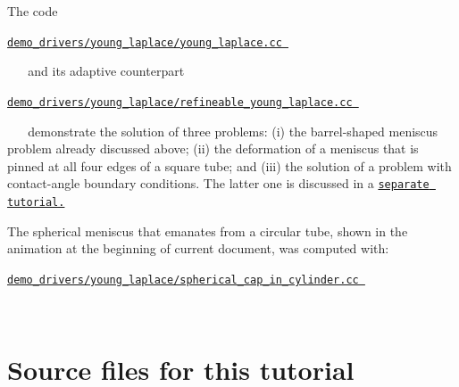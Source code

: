 \begin{DoxyEnumerate}
\begin{DoxyItemize}
\item The code ~\newline
~\newline
 \begin{center} \href{../../../../demo_drivers/young_laplace/young_laplace.cc}{\tt demo\+\_\+drivers/young\+\_\+laplace/young\+\_\+laplace.\+cc } \end{center}  ~\newline
~\newline
 and its adaptive counterpart ~\newline
~\newline
 \begin{center} \href{../../../../demo_drivers/young_laplace/refineable_young_laplace.cc}{\tt demo\+\_\+drivers/young\+\_\+laplace/refineable\+\_\+young\+\_\+laplace.\+cc } \end{center}  ~\newline
~\newline
 demonstrate the solution of three problems\+: (i) the barrel-\/shaped meniscus problem already discussed above; (ii) the deformation of a meniscus that is pinned at all four edges of a square tube; and (iii) the solution of a problem with contact-\/angle boundary conditions. The latter one is discussed in a \href{../../contact_angle/html/index.html}{\tt separate tutorial.} ~\newline
~\newline

\item The spherical meniscus that emanates from a circular tube, shown in the animation at the beginning of current document, was computed with\+: ~\newline
~\newline
 \begin{center} \href{../../../../demo_drivers/young_laplace/spherical_cap_in_cylinder.cc}{\tt demo\+\_\+drivers/young\+\_\+laplace/spherical\+\_\+cap\+\_\+in\+\_\+cylinder.\+cc } \end{center}  ~\newline
~\newline

\end{DoxyItemize}
\end{DoxyEnumerate}



 

\hypertarget{index_sources}{}\section{Source files for this tutorial}\label{index_sources}

